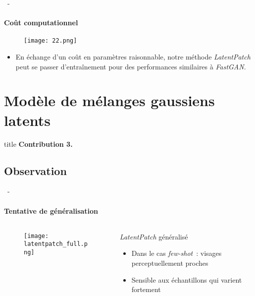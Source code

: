 \documentclass[aspectratio=169, 22pt]{beamer}
\begin{document}
\begin{frame}{\secname~- \subsecname}
  \framesubtitle{Coût computationnel}
  \begin{figure}
    \texttt{[image: 22.png]}
  \end{figure}
  \begin{itemize}
  \item En échange d'un coût en paramètres raisonnable, notre méthode
    \emph{LatentPatch} peut se passer d'entraînement pour des performances
    similaires à \emph{FastGAN}.
  \end{itemize}
\end{frame}

\section{Modèle de mélanges gaussiens latents}
\begin{frame}
  \begin{beamercolorbox}[sep=15pt,center,shadow=true,rounded=true]{title}
    \LARGE\bfseries Contribution 3. \\ \secname
  \end{beamercolorbox}
\end{frame}

\subsection{Observation}
\begin{frame}{\secname~- \subsecname}
  \framesubtitle{Tentative de généralisation}
  \begin{columns}
    \begin{column}{0.6\linewidth}
      \begin{figure}
        \centering
        \texttt{[image: latentpatch\_full.png]}
      \end{figure}
    \end{column}
    \begin{column}{0.4\linewidth}
      \begin{alertblock}{\emph{LatentPatch} généralisé}
        \begin{itemize}
        \item Dans le cas \emph{few-shot} : visages perceptuellement proches
        \item Sensible aux échantillons qui varient fortement
        \end{itemize}
      \end{alertblock}
    \end{column}
  \end{columns}
\end{frame}
\end{document}
